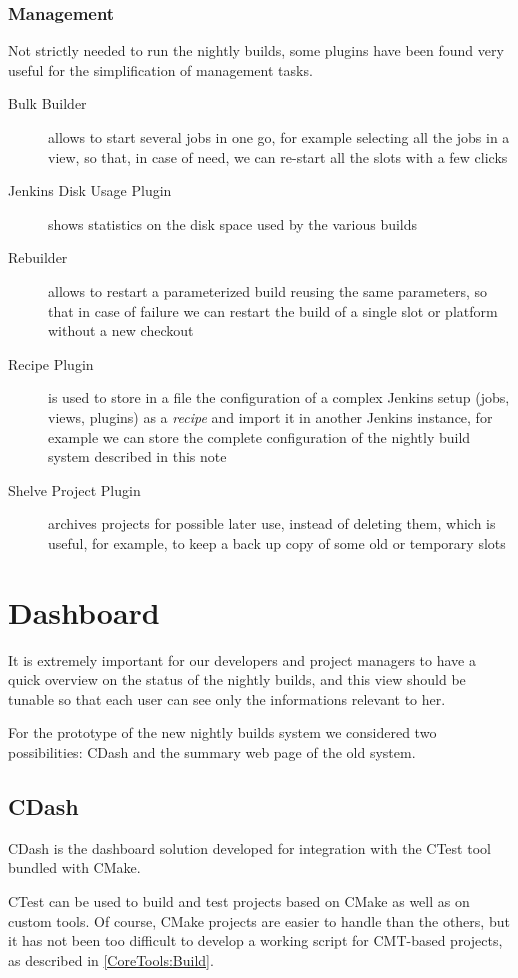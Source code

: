\documentclass{lhcbnote}
\begin{document}
\subsubsection{Management}
\label{Jenkins:Management}
Not strictly needed to run the nightly builds, some plugins have been found very
useful for the simplification of management tasks.
\begin{description}
  \item[Bulk Builder] allows to start several jobs in one go, for example
selecting all the jobs in a view, so that, in case of need, we can re-start all
the slots with a few clicks
  \item[Jenkins Disk Usage Plugin] shows statistics on the disk space used by
the various builds
  \item[Rebuilder] allows to restart a parameterized build reusing the same
parameters, so that in case of failure we can restart the build of a single slot
or platform without a new checkout
  \item[Recipe Plugin] is used to store in a file the configuration of a complex
Jenkins setup (jobs, views, plugins) as a \emph{recipe} and import it in another
Jenkins instance, for example we can store the complete configuration of the
nightly build system described in this note
  \item[Shelve Project Plugin] archives projects for possible later use, instead
of deleting them, which is useful, for example, to keep a back up copy of some
old or temporary slots
\end{description}

\section{Dashboard}
It is extremely important for our developers and project managers to have a
quick overview on the status of the nightly builds, and this view should be
tunable so that each user can see only the informations relevant to her.

For the prototype of the new nightly builds system we considered two
possibilities: CDash and the summary web page of the old system.

\subsection{CDash}
CDash is the dashboard solution developed for integration with the CTest tool
bundled with CMake.

CTest can be used to build and test projects based on CMake as well as on custom
tools.  Of course, CMake projects are easier to handle than the others, but it
has not been too difficult to develop a working script for CMT-based projects,
as described in \ref{CoreTools:Build}.
\end{document}
